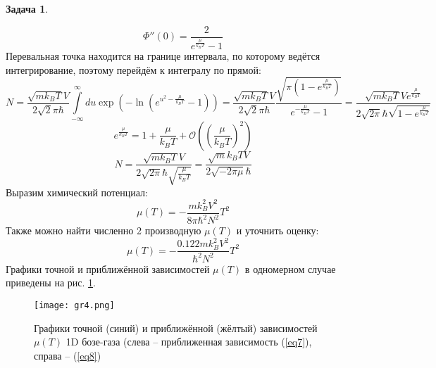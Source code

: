 \documentclass[12pt]{article}
\theoremstyle{definition}
\newtheorem{zad}{Задача}[section]
\begin{document}
\begin{zad}
\begin{enumerate}
\begin{equation}
    \Phi''(0)=\frac{2}{e^\frac{\mu}{k_BT}-1}
\end{equation}
Перевальная точка находится на границе интервала, по которому ведётся интегрирование, поэтому перейдём к интегралу по прямой:
\begin{equation*}
    N=\frac{\sqrt{mk_BT}V}{2\sqrt{2}\pi\hbar}\int\limits_{-\infty}^\infty du\exp\left(-\ln\left(e^{u^2-\frac{\mu}{k_BT}}-1\right)\right)=\frac{\sqrt{mk_BT}V}{2\sqrt{2}\pi\hbar}\frac{\sqrt{\pi\left(1-e^\frac{\mu}{k_BT}\right)}}{e^{-\frac{\mu}{k_BT}}-1}=\frac{\sqrt{mk_BT}Ve^\frac{\mu}{k_BT}}{2\sqrt{2\pi}\hbar\sqrt{1-e^\frac{\mu}{k_BT}}}
\end{equation*}
\begin{equation}
    e^\frac{\mu}{k_BT}=1+\frac{\mu}{k_BT}+\mathcal{O}\left(\left(\frac{\mu}{k_BT}\right)^2\right)
\end{equation}
\begin{equation}
    N=\frac{\sqrt{mk_BT}V}{2\sqrt{2\pi}\hbar\sqrt{\frac{\mu}{k_BT}}}=\frac{\sqrt{m}k_BTV}{2\sqrt{-2\pi\mu}\hbar}
\end{equation}
Выразим химический потенциал:
\begin{equation}\label{eq7}
    \boxed{\mu(T)=-\frac{mk_B^2V^2}{8\pi\hbar^2N^2}T^2}
\end{equation}
Также можно найти численно 2 производную $\mu(T)$ и уточнить оценку:
\begin{equation}\label{eq8}
    \boxed{\mu(T)=-\frac{0.122mk_B^2V^2}{\hbar^2N^2}T^2}
\end{equation}
Графики точной и приближённой зависимостей $\mu(T)$ в одномерном случае приведены на рис. \ref{gr4}.
\begin{figure}
    \centering
    \texttt{[image: gr4.png]}
    \caption{Графики точной (синий) и приближённой (жёлтый) зависимостей $\mu(T)$ 1D бозе-газа (слева -- приближенная зависимость (\ref{eq7}), справа -- (\ref{eq8})}
    \label{gr4}
\end{figure}
\end{enumerate}
\end{zad}
\end{document}
